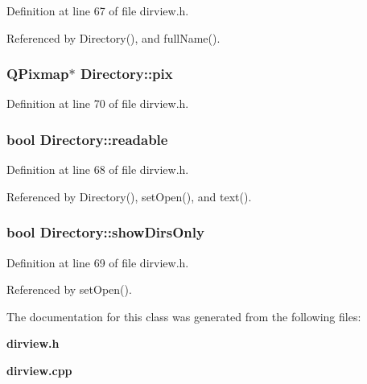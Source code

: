 Definition at line 67 of file dirview.h.

Referenced by Directory(), and full\-Name().
\subsubsection{\setlength{\rightskip}{0pt plus 5cm}QPixmap$\ast$ {\bf Directory::pix}\hspace{0.3cm}{\tt  [private]}}\label{classDirectory_Directoryr4}




Definition at line 70 of file dirview.h.
\subsubsection{\setlength{\rightskip}{0pt plus 5cm}bool {\bf Directory::readable}\hspace{0.3cm}{\tt  [private]}}\label{classDirectory_Directoryr2}




Definition at line 68 of file dirview.h.

Referenced by Directory(), set\-Open(), and text().
\subsubsection{\setlength{\rightskip}{0pt plus 5cm}bool {\bf Directory::show\-Dirs\-Only}\hspace{0.3cm}{\tt  [private]}}\label{classDirectory_Directoryr3}




Definition at line 69 of file dirview.h.

Referenced by set\-Open().

The documentation for this class was generated from the following files:\begin{CompactItemize}
\item 
{\bf dirview.h}\item 
{\bf dirview.cpp}\end{CompactItemize}
